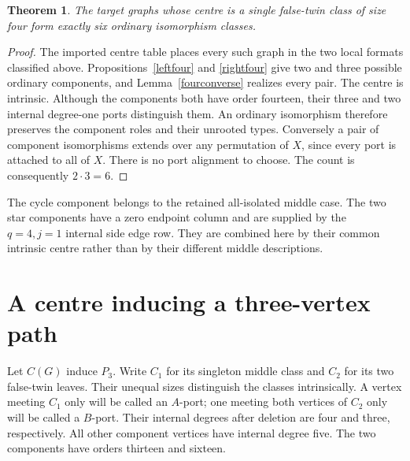 \documentclass[11pt]{article}
\newtheorem{theorem}{Theorem}
\begin{document}
\begin{theorem}\label{sixfour}
The target graphs whose centre is a single false-twin class of size
four form exactly six ordinary isomorphism classes.
\end{theorem}
\begin{proof}
The imported centre table places every such graph in the two local
formats classified above. Propositions~\ref{leftfour} and
\ref{rightfour} give two and three possible ordinary components,
and Lemma~\ref{fourconverse} realizes every pair. The centre is intrinsic.
Although the components both have order fourteen, their three and two
internal degree-one ports distinguish them. An ordinary isomorphism
therefore preserves the component roles and their unrooted types.
Conversely a pair of component isomorphisms extends over any permutation
of $X$, since every port is attached to all of $X$. There is no port
alignment to choose. The count is consequently $2\cdot3=6$.
\end{proof}

The cycle component belongs to the retained all-isolated middle case.
The two star components have a zero endpoint column and are supplied
by the $q=4,j=1$ internal side edge row. They are combined here by
their common intrinsic centre rather than by their different middle
descriptions.

\section{A centre inducing a three-vertex path}

Let $C(G)$ induce $P_3$. Write $C_1$ for its singleton middle class
and $C_2$ for its two false-twin leaves. Their unequal sizes distinguish
the classes intrinsically. A vertex meeting $C_1$ only will be called
an $A$-port; one meeting both vertices of $C_2$ only will be called a
$B$-port. Their internal degrees after deletion are four and three,
respectively. All other component vertices have internal degree five.
The two components have orders thirteen and sixteen.
\end{document}
